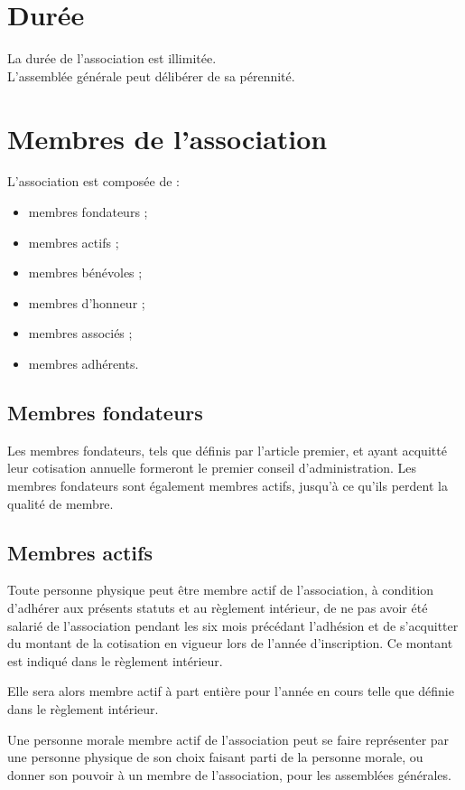 \documentclass[a4wide,12pt]{scrartcl}
\begin{document}
\section{Durée}

La durée de l'association est illimitée.\\ 
L'assemblée générale peut délibérer de sa pérennité.

\section{Membres de l'association}

L'association est composée de :
\begin{itemize}
\item membres fondateurs ;
\item membres actifs ;
\item membres bénévoles ;
\item membres d'honneur ;
\item membres associés ;
\item membres adhérents.
\end{itemize}

\subsection{Membres fondateurs}

Les membres fondateurs, tels que définis par l'article premier, et
ayant acquitté leur cotisation annuelle formeront le premier conseil
d'administration. Les membres fondateurs sont également membres
actifs, jusqu'à ce qu'ils perdent la qualité de membre.

\subsection{Membres actifs}

Toute personne physique peut être membre actif de l'association, à
condition d'adhérer aux présents statuts et au règlement intérieur, de
ne pas avoir été salarié de l'association pendant les six mois
précédant l'adhésion et de s'acquitter du montant de la cotisation en
vigueur lors de l'année d'inscription. Ce montant est indiqué dans le
règlement intérieur.

Elle sera alors membre actif à part entière pour l'année en cours
telle que définie dans le règlement intérieur.

Une personne morale membre actif de l'association peut se faire
représenter par une personne physique de son choix faisant parti de la
personne morale, ou donner son pouvoir à un membre de l'association,
pour les assemblées générales.
\end{document}

